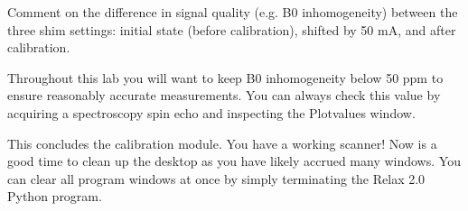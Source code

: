 \noindent{}\color{red} Comment on the difference in signal quality (e.g. B0 inhomogeneity) between the three shim settings: initial state (before calibration), shifted by 50 mA, and after calibration.
\color{black}

Throughout this lab you will want to keep B0 inhomogeneity below 50 ppm to ensure reasonably accurate measurements. You can always check this value by acquiring a spectroscopy spin echo and inspecting the Plotvalues window.
\vspace{5mm}

\noindent{} This concludes the calibration module. You have a working scanner! Now is a good time to clean up the desktop as you have likely accrued many windows. You can clear all program windows at once by simply terminating the Relax 2.0 Python program.




